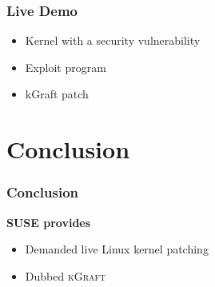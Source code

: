 \documentclass[xcolor=dvipsnames,handout]{beamer}
\newcommand{\heading}[1]{\textbf{\textcolor{BurntOrange}{#1}}}
\newcommand\kgr{\textsc{kGraft}\xspace}
\begin{document}
\begin{frame}
  \frametitle{Live Demo}

  \begin{itemize}
    \item Kernel with a security vulnerability
    \item Exploit program
    \item kGraft patch
  \end{itemize}

\end{frame}

\section{Conclusion}

\begin{frame}
  \frametitle{Conclusion}

  \heading{SUSE provides}
  \begin{itemize}
    \item Demanded live Linux kernel patching
    \item Dubbed \kgr
  \end{itemize}

\end{frame}
\end{document}
